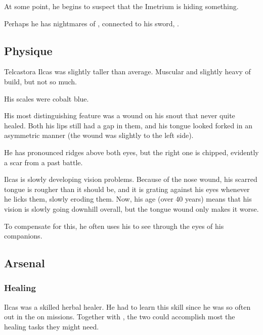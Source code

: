 At some point, he begins to suspect that the Imetrium is hiding something. 

Perhaps he has nightmares of , connected to his sword, .










\subsection{Physique}
Telcastora Ilcas was slightly taller than average.
Muscular and slightly heavy of build, but not so much.

His scales were cobalt blue. 

His most distinguishing feature was a wound on his snout that never quite healed. 
Both his lips still had a gap in them, and his tongue looked forked in an asymmetric manner (the wound was slightly to the left side). 

He has pronounced ridges above both eyes, but the right one is chipped, evidently a scar from a past battle.

Ilcas is slowly developing vision problems. Because of the nose wound, his scarred tongue is rougher than it should be, and it is grating against his eyes whenever he licks them, slowly eroding them. Now, his age (over 40 years) means that his vision is slowly going downhill overall, but the tongue wound only makes it worse. 

To compensate for this, he often uses his  to see through the eyes of his \nycan{} companions. 










\subsection{Arsenal}
\subsubsection{Healing}
Ilcas was a skilled herbal healer. 
He had to learn this skill since he was so often out in the \Wylde{} on missions. 
Together with , the two could accomplish most the healing tasks they might need. 




